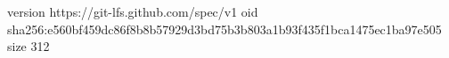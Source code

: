 version https://git-lfs.github.com/spec/v1
oid sha256:e560bf459dc86f8b8b57929d3bd75b3b803a1b93f435f1bca1475ec1ba97e505
size 312
